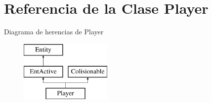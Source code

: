 \hypertarget{classPlayer}{\section{Referencia de la Clase Player}
\label{classPlayer}
}
Diagrama de herencias de Player\begin{figure}[H]
\begin{center}
\leavevmode
\includegraphics[height=3.000000cm]{classPlayer}
\end{center}
\end{figure}
